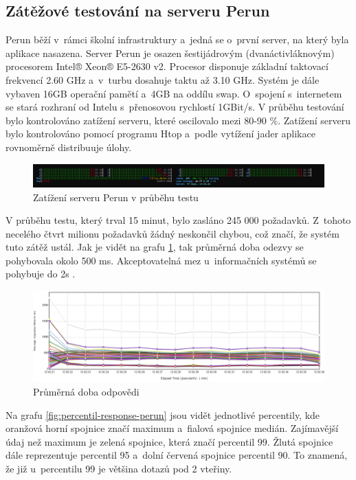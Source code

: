 \subsection{Zátěžové testování na serveru Perun}
Perun běží v~rámci školní infrastruktury a~jedná se o~první server, na který byla aplikace nasazena. 
\newpara
Server Perun je osazen šestijádrovým (dvanáctivláknovým) procesorem Intel® Xeon® E5-2630 v2. Procesor disponuje základní taktovací frekvencí 2.60 GHz a~v~turbu dosahuje taktu až 3.10 GHz. Systém je dále vybaven 16GB operační pamětí a~4GB na oddílu swap. O~spojení s~internetem se stará rozhraní od Intelu s~přenosovou rychlostí 1GBit/s.
\newpara
V průběhu testování bylo kontrolováno zatížení serveru, které oscilovalo mezi 80-90 \%. Zatížení serveru bylo kontrolováno pomocí programu Htop a~podle vytížení jader aplikace rovnoměrně distribuuje úlohy.

\begin{figure}[htbp]
    \centering
        \includegraphics[scale=.2]{obrazky-figures/testing/performance/perun/htop.png}
        \caption{Zatížení serveru Perun v průběhu testu}
\end{figure}

\noindent
V průběhu testu, který trval 15 minut, bylo zasláno 245 000 požadavků. Z~tohoto necelého čtvrt milionu požadavků žádný neskončil chybou, což značí, že systém tuto zátěž ustál.
\newpara
Jak je vidět na grafu \ref{fig:average-response-perun}, tak průměrná doba odezvy se pohybovala okolo 500 ms. Akceptovatelná mez u~informačních systémů se pohybuje do 2s \cite{performanceLatency}. 
\begin{figure}[htbp]
    \centering
        \includegraphics[scale=.34]{obrazky-figures/testing/performance/perun/flotResponseTimesOverTime.png}
        \caption{Průměrná doba odpovědi}
        \label{fig:average-response-perun}
\end{figure}

\newpage
\noindent
Na grafu \ref{fig:percentil-response-perun} jsou vidět jednotlivé percentily, kde oranžová horní spojnice značí maximum a~fialová spojnice medián. Zajímavější údaj než maximum je zelená spojnice, která značí percentil 99. Žlutá spojnice dále reprezentuje percentil 95 a~dolní červená spojnice percentil 90. To znamená, že již u~percentilu 99 je většina dotazů pod 2 vteřiny.

